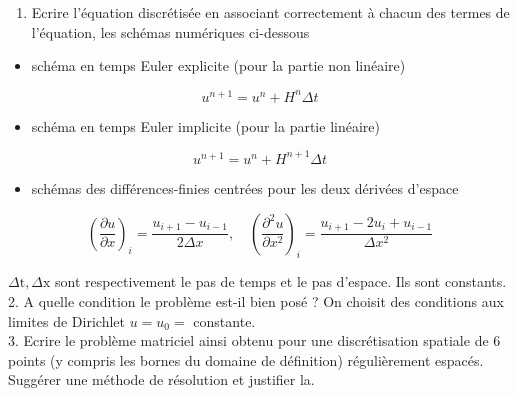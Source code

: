 \documentclass[10pt]{article}
\begin{document}
\begin{enumerate}
  \item Ecrire l'équation discrétisée en associant correctement à chacun des termes de l'équation, les schémas numériques ci-dessous
\end{enumerate}

\begin{itemize}
  \item schéma en temps Euler explicite (pour la partie non linéaire)
\end{itemize}

\[
u^{n+1}=u^{n}+H^{n} \Delta t
\]

\begin{itemize}
  \item schéma en temps Euler implicite (pour la partie linéaire)
\end{itemize}

\[
u^{n+1}=u^{n}+H^{n+1} \Delta t
\]

\begin{itemize}
  \item schémas des différences-finies centrées pour les deux dérivées d'espace
\end{itemize}

\[
\left(\frac{\partial u}{\partial x}\right)_{i}=\frac{u_{i+1}-u_{i-1}}{2 \Delta x}, \quad\left(\frac{\partial^{2} u}{\partial x^{2}}\right)_{i}=\frac{u_{i+1}-2 u_{i}+u_{i-1}}{\Delta x^{2}}
\]

\(\Delta \mathrm{t}, \Delta \mathrm{x}\) sont respectivement le pas de temps et le pas d'espace. Ils sont constants.\\
2. A quelle condition le problème est-il bien posé ? On choisit des conditions aux limites de Dirichlet \(u=u_{0}=\) constante.\\
3. Ecrire le problème matriciel ainsi obtenu pour une discrétisation spatiale de 6 points (y compris les bornes du domaine de définition) régulièrement espacés. Suggérer une méthode de résolution et justifier la.
\end{document}
